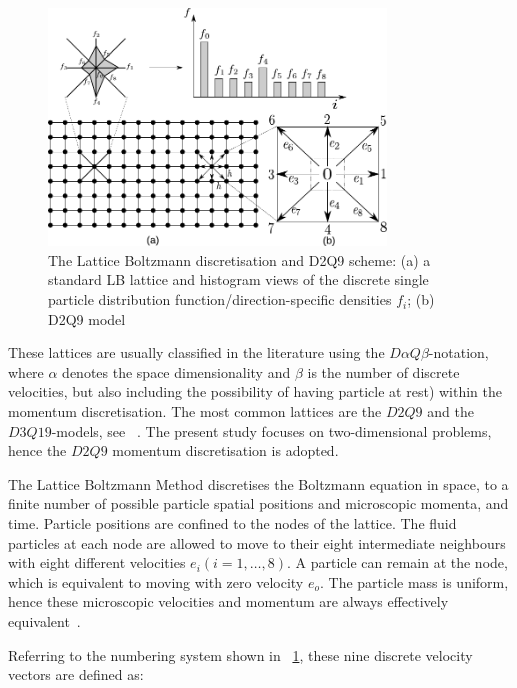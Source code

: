 \begin{figure}[htpb]
\centering
\includegraphics[width=0.8\textwidth]{D2Q9}
\caption[The Lattice Boltzmann discretisation and D2Q9 scheme]{The Lattice 
Boltzmann discretisation and D2Q9 scheme: (a) a standard LB lattice and 
histogram views of the discrete single particle distribution 
function/direction-specific densities $f_i$; (b) D2Q9 model}
\label{fig:D2Q9}
\end{figure}

These lattices are usually classified in the literature using the $\mathit{D}\alpha\mathit{Q}\beta$-notation, where $\alpha$ denotes the space dimensionality and $\beta$ is the number of discrete velocities, but also including the possibility of having particle at rest) within the momentum discretisation. The most common lattices are the $\mathit{D2Q9}$ and the $\mathit{D3Q19}$-models, see ~\citet{He1997}. The present study focuses on two-dimensional problems, hence the $\mathit{D2Q9}$ momentum discretisation is adopted.

The Lattice Boltzmann Method discretises the Boltzmann equation in space, to a 
finite number of possible particle spatial positions and microscopic momenta, 
and time. Particle positions are confined to the nodes of the lattice. The 
fluid particles at each node are allowed to move to their eight intermediate 
neighbours with eight different velocities $\mathit{e_i} 
(\mathit{i}=1,\dots,8)$. A particle can remain at the node, which is equivalent 
to moving with zero velocity $\mathit{e_o}$. The particle mass is uniform, 
hence these microscopic velocities and momentum are always effectively 
equivalent~\citep{Han2007}.

Referring to the numbering system shown in ~\cref{fig:D2Q9}, these nine discrete velocity vectors are defined as:

